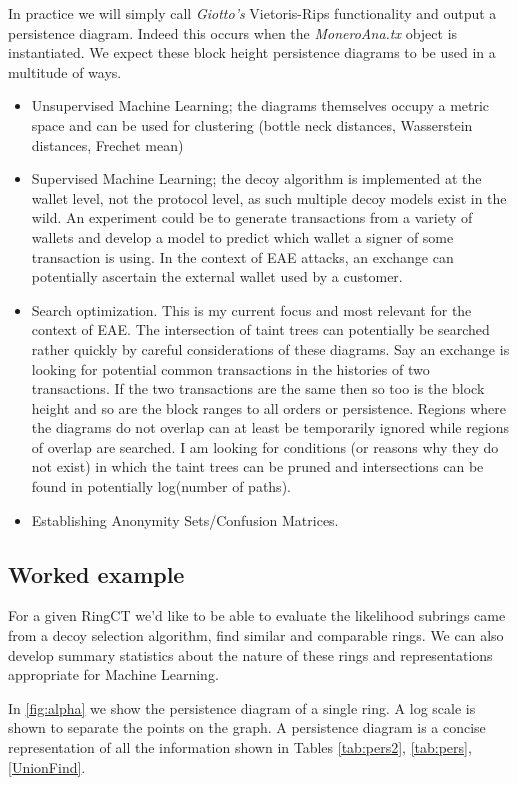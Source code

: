 In practice we will simply call \textit{Giotto's} Vietoris-Rips functionality and output a persistence diagram.  Indeed this occurs when the \textit{MoneroAna.tx} object is instantiated.  We expect these block height persistence diagrams to be used in a multitude of ways.  
\begin{itemize}
\item Unsupervised Machine Learning; the diagrams themselves occupy a metric space and can be used for clustering (bottle neck distances, Wasserstein distances, Frechet mean)
\item Supervised Machine Learning; the decoy algorithm is implemented at the wallet level, not the protocol level, as such multiple decoy models exist in the wild.  An experiment could be to generate transactions from a variety of wallets and develop a model to predict which wallet a signer of some transaction is using.  In the context of EAE attacks, an exchange can potentially ascertain the external wallet used by a customer.
\item Search optimization.  This is my current focus and most relevant for the context of EAE.  The intersection of taint trees can potentially be searched rather quickly by careful considerations of these diagrams.  Say an exchange is looking for potential common transactions in the histories of two transactions.  If the two transactions are the same then so too is the block height and so are the block ranges to all orders or persistence.  Regions where the diagrams do not overlap can at least be temporarily ignored while regions of overlap are searched.  I am looking for conditions (or reasons why they do not exist) in which the taint trees can be pruned and intersections can be found in potentially log(number of paths).
\item Establishing Anonymity Sets/Confusion Matrices.

\end{itemize}

\subsection{Worked example}

For a given RingCT we'd like to be able to evaluate the likelihood subrings came from a decoy selection algorithm, find similar and comparable rings.  
We can also develop summary statistics about the nature of these rings and representations appropriate for Machine Learning.   

In \ref{fig:alpha} we show the persistence diagram of a single ring.  A log scale is shown to separate the points on the graph.  A persistence diagram is a concise representation of all the information shown in Tables \ref{tab:pers2}, \ref{tab:pers}, \ref{UnionFind}.

